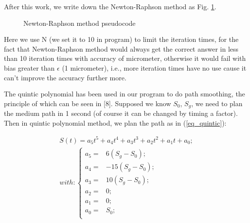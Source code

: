 \documentclass[letterpaper, 10 pt, conference]{ieeeconf}  %
\begin{document}
After this work, we write down the Newton-Raphson method as Fig. \ref{fig_newton}.

\begin{figure}[thpb]
      \centering
      \caption{Newton-Raphson method pseudocode}
      \label{fig_newton}
\end{figure}

Here we use N (we set it to 10 in program) to limit the iteration times, for the fact that Newton-Raphson method would always get the correct answer in less than 10 iteration times with accuracy of micrometer, otherwise it would fail with bias greater than $\epsilon$ (1 micrometer), i.e., more iteration times have no use cause it can't improve the accuracy further more.

The quintic polynomial has been used in our program to do path smoothing, the principle of which can be seen in [8]. Supposed we know $S_{0}$, $S_{g}$, we need to plan the medium path in 1 second (of course it can be changed by timing a factor). Then in quintic polynomial method, we plan the path as in (\ref{eq_quintic}):

\begin{equation}
\begin{array}{c}
S(t) = a_{5}t^5+a_{4}t^4+a_{3}t^3+a_{2}t^2+a_{1}t+a_{0};\\
with:
\left \{
\begin{array}{ll}
a_{5} = &6(S_{g}-S_{0});\\
a_{4} = &-15(S_{g}-S_{0});\\
a_{3} = &10(S_{g}-S_{0});\\
a_{2} = &0;\\
a_{1} = &0;\\
a_{0} = &S_{0};\\
\end{array}
\right.
\end{array}
\label{eq_quintic}
\end{equation}
\end{document}
